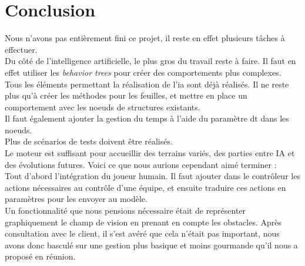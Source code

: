 \newpage
\section{Conclusion}


Nous n'avons pas entièrement fini ce projet, il reste en effet plusieurs tâches à effectuer.\\

Du côté de l'intelligence artificielle, le plus gros du travail reste à faire. Il faut en effet utiliser les \textit{behavior trees} pour créer des comportements plus complexes.\\
Tous les éléments permettant la réalisation de l'ia sont déjà réalisés. Il ne reste plus qu'à créer les méthodes pour les feuilles, et mettre en place un comportement avec les noeuds de structures existants.\\
Il faut également ajouter la gestion du temps à l'aide du paramètre dt dans les noeuds.\\
Plus de scénarios de tests doivent être réalisés. \\




Le moteur est suffisant pour accueillir des terrains variés, des parties entre IA et des évolutions futures. Voici ce que nous aurions cependant aimé terminer :\\

Tout d'abord l'intégration du joueur humain. Il faut ajouter dans le contrôleur les actions nécessaires au contrôle d'une équipe, et ensuite traduire ces actions en paramètres pour les envoyer au modèle.\\

Un fonctionnalité que nous pensions nécessaire était de représenter graphiquement le champ de vision en prenant en compte les obstacles. Après consultation avec le client, il s'est avéré que cela n'était pas important, nous avons donc basculé sur une gestion plus basique et moins gourmande qu'il nous a proposé en réunion.\\

